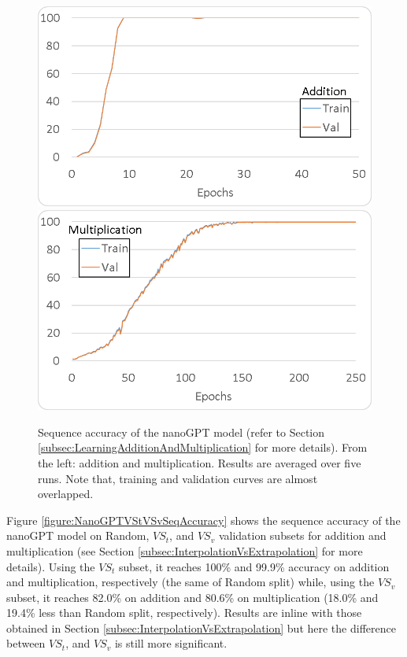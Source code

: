 \documentclass[final,1p,times,authoryear]{elsarticle}
\begin{document}
\begin{figure}[h]
\begin{center}
\includegraphics[scale=1.05]{NanoGPTAdditionSeqAccuracies}
\includegraphics[scale=1.05]{NanoGPTMultiplicationSeqAccuracies}
\end{center}
\caption{Sequence accuracy of the nanoGPT model (refer to Section \ref{subsec:LearningAdditionAndMultiplication} for more details). From the left: addition and multiplication. Results are averaged over five runs. Note that, training and validation curves are almost overlapped.}
\label{figure:NanoGPTAddMulSeqAccuracies}
\end{figure}

Figure \ref{figure:NanoGPTVStVSvSeqAccuracy} shows the sequence accuracy of the nanoGPT model on Random, $VS_t$, and $VS_v$ validation subsets for addition and multiplication (see Section \ref{subsec:InterpolationVsExtrapolation} for more details). Using the $VS_t$ subset, it reaches 100\% and 99.9\% accuracy on addition and multiplication, respectively (the same of Random split) while, using the $VS_v$ subset, it reaches 82.0\% on addition and 80.6\% on multiplication (18.0\% and 19.4\% less than Random split, respectively). Results are inline with those obtained in Section \ref{subsec:InterpolationVsExtrapolation} but here the difference between $VS_t$, and $VS_v$ is still more significant.
\end{document}
